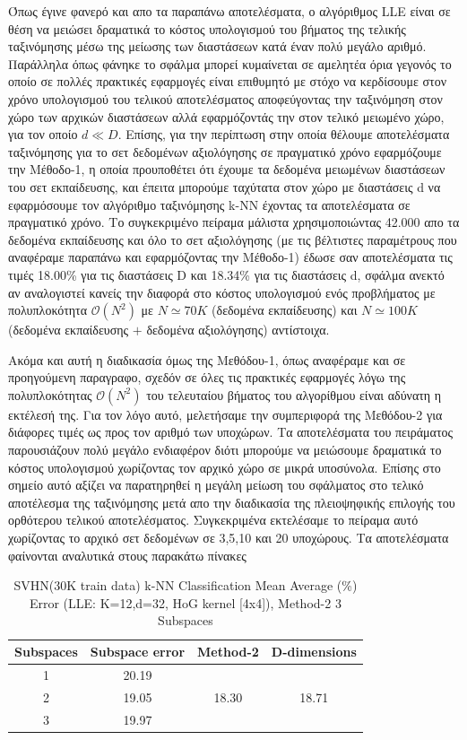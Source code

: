 Όπως έγινε φανερό και απο τα παραπάνω αποτελέσματα, ο αλγόριθμος \textlatin{LLE} είναι σε θέση να μειώσει δραματικά το κόστος υπολογισμού του βήματος της τελικής ταξινόμησης μέσω της μείωσης των διαστάσεων κατά έναν πολύ μεγάλο αριθμό. Παράλληλα όπως φάνηκε το σφάλμα μπορεί κυμαίνεται σε αμελητέα όρια γεγονός το οποίο σε πολλές πρακτικές εφαρμογές είναι επιθυμητό με στόχο να κερδίσουμε στον χρόνο υπολογισμού του τελικού αποτελέσματος αποφεύγοντας την ταξινόμηση στον χώρο των αρχικών διαστάσεων αλλά εφαρμόζοντάς την στον τελικό μειωμένο χώρο, για τον οποίο $d \ll D$. Επίσης, για την περίπτωση στην οποία θέλουμε αποτελέσματα ταξινόμησης για το σετ δεδομένων αξιολόγησης σε πραγματικό χρόνο εφαρμόζουμε την Μέθοδο-1, η οποία προυποθέτει ότι έχουμε τα δεδομένα μειωμένων διαστάσεων του σετ εκπαίδευσης, και έπειτα μπορούμε ταχύτατα στον χώρο με διαστάσεις \textlatin{d} να εφαρμόσουμε τον αλγόριθμο ταξινόμησης \textlatin{k-NN} έχοντας τα αποτελέσματα σε πραγματικό χρόνο. Το συγκεκριμένο πείραμα μάλιστα χρησιμοποιώντας 42.000 απο τα δεδομένα εκπαίδευσης και όλο το σετ αξιολόγησης (με τις βέλτιστες παραμέτρους που αναφέραμε παραπάνω και εφαρμόζοντας την Μέθοδο-1) έδωσε σαν αποτελέσματα τις τιμές 18.00\% για τις διαστάσεις \textlatin{D} και 18.34\% για τις διαστάσεις \textlatin{d}, σφάλμα ανεκτό αν αναλογιστεί κανείς την διαφορά στο κόστος υπολογισμού ενός προβλήματος με πολυπλοκότητα $ \mathcal{O}(N^2)$ με $N \simeq 70K$ (δεδομένα εκπαίδευσης) και $N \simeq 100K$ (δεδομένα εκπαίδευσης $+$ δεδομένα αξιολόγησης) αντίστοιχα.
\par
Ακόμα και αυτή η διαδικασία όμως της Μεθόδου-1, όπως αναφέραμε και σε προηγούμενη παραγραφο, σχεδόν σε όλες τις πρακτικές εφαρμογές λόγω της πολυπλοκότητας $ \mathcal{O}(N^2)$  του τελευταίου βήματος του αλγορίθμου είναι αδύνατη η εκτέλεσή της. Για τον λόγο αυτό, μελετήσαμε την συμπεριφορά της Μεθόδου-2 για διάφορες τιμές ως προς τον αριθμό των υποχώρων. Τα αποτελέσματα του πειράματος παρουσιάζουν πολύ μεγάλο ενδιαφέρον διότι μπορούμε να μειώσουμε δραματικά το κόστος υπολογισμού χωρίζοντας τον αρχικό χώρο σε μικρά υποσύνολα. Επίσης στο σημείο αυτό αξίζει να παρατηρηθεί η μεγάλη μείωση του σφάλματος στο τελικό αποτέλεσμα της ταξινόμησης μετά απο την διαδικασία της πλειοψηφικής επιλογής του ορθότερου τελικού αποτελέσματος. Συγκεκριμένα εκτελέσαμε το πείραμα αυτό χωρίζοντας το αρχικό σετ δεδομένων σε 3,5,10 και 20 υποχώρους. Τα αποτελέσματα φαίνονται αναλυτικά στους παρακάτω πίνακες
\begin{table}[H]
\centering
\label{tab:table14}
\begin{tabular}{|c|c|c|c|}
\hline
\textlatin{Subspaces} & \textlatin{Subspace error} & \textlatin{Method-2} & \textlatin{D-dimensions}  \\
\hline
1 & 20.19 & & \\
2 & 19.05 & 18.30 & 18.71 \\
3 & 19.97 & & \\
\hline
\end{tabular}
\caption{\textlatin{SVHN(30K train data) k-NN Classification Mean Average (\%) Error (LLE: K=12,d=32, HoG kernel [4x4]), Method-2 3 Subspaces}}
\end{table}


